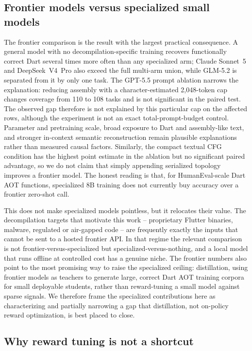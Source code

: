 \documentclass[11pt]{article}
\begin{document}
\subsection{Frontier models versus specialized small models}

The frontier comparison is the result with the largest practical consequence. A general model with no decompilation-specific training recovers functionally correct Dart several times more often than any specialized arm; Claude Sonnet~5 and DeepSeek~V4~Pro also exceed the full multi-arm union, while GLM-5.2 is separated from it by only one task. The GPT-5.5 prompt ablation narrows the explanation: reducing assembly with a character-estimated 2{,}048-token cap changes coverage from 110 to 108 tasks and is not significant in the paired test. The observed gap therefore is not explained by this particular cap on the affected rows, although the experiment is not an exact total-prompt-budget control. Parameter and pretraining scale, broad exposure to Dart and assembly-like text, and stronger in-context semantic reconstruction remain plausible explanations rather than measured causal factors. Similarly, the compact textual CFG condition has the highest point estimate in the ablation but no significant paired advantage, so we do not claim that simply appending serialized topology improves a frontier model. The honest reading is that, for HumanEval-scale Dart AOT functions, specialized 8B training does not currently buy accuracy over a frontier zero-shot call.

This does not make specialized models pointless, but it relocates their value. The decompilation targets that motivate this work -- proprietary Flutter binaries, malware, regulated or air-gapped code -- are frequently exactly the inputs that cannot be sent to a hosted frontier API. In that regime the relevant comparison is not frontier-versus-specialized but specialized-versus-nothing, and a local model that runs offline at controlled cost has a genuine niche. The frontier numbers also point to the most promising way to raise the specialized ceiling: distillation, using frontier models as teachers to generate large, correct Dart AOT training corpora for small deployable students, rather than reward-tuning a small model against sparse signals. We therefore frame the specialized contributions here as characterizing and partially narrowing a gap that distillation, not on-policy reward optimization, is best placed to close.

\subsection{Why reward tuning is not a shortcut}
\end{document}
